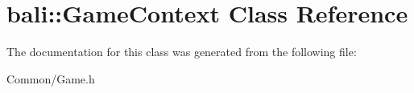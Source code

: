 \hypertarget{classbali_1_1_game_context}{\section{bali\-:\-:Game\-Context Class Reference}
\label{classbali_1_1_game_context}
}


The documentation for this class was generated from the following file\-:\begin{DoxyCompactItemize}
\item 
Common/Game.\-h\end{DoxyCompactItemize}
